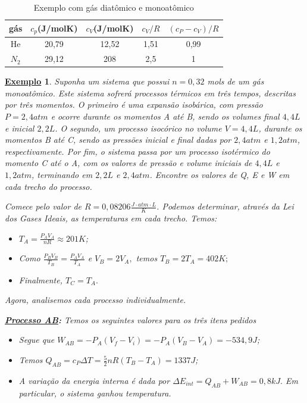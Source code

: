 \documentclass{article}
\newtheorem{example}{\underline{Exemplo}}
\begin{document}
\begin{center}
  \begin{table}[h!]
    \caption{Exemplo com gás diatômico e monoatômico}
    \centering
    \begin{tabular}{| c | c | c | c | c |}
      \hline
      gás & \(c_{p}\)(J/molK) & \(c_{V}\)(J/molK) & \(c_{V}/R\) & \((c_{P}-c_{V})/R\)\\
      \hline
      He & 20,79 & 12,52 & 1,51 & 0,99\\
      \(N_{2}\) & 29,12 & 208 & 2,5 & 1\\
      \hline
    \end{tabular}
  \end{table}
\end{center}
\begin{example}
  Suponha um sistema que possui \(n=0,32\) mols de um gás monoatômico. Este sistema sofrerá processos térmicos em três tempos,
  descritas por três momentos. O primeiro é uma expansão isobárica, com pressão \(P = 2,4atm\) e ocorre durante os momentos A até B, sendo os volumes final \(4,4L\) e inicial \(2,2L\). O segundo,
  um processo isocórico no volume \(V = 4,4L\), durante os momentos B até C, sendo as pressões inicial e final dadas por \(2,4atm\) e \(1,2atm\), respectivamente.
  Por fim, o sistema passa por um processo isotérmico do momento C até o A, com os valores de pressão e volume iniciais de \(4,4L\) e \(1,2atm\), terminando
  em \(2,2L\) e \(2,4atm\). Encontre os valores de Q, E e W em cada trecho do processo.

  Comece pelo valor de \(R = 0,08206 \frac{J \cdot atm \cdot L}{K}\). Podemos determinar, através da Lei dos Gases Ideais, 
  as temperaturas em cada trecho. Temos:
  \begin{itemize}
    \item[A)] \(T_{A} = \frac{P_{A}V_{A}}{nR}\approx 201K\);
    \item[B)] Como \(\frac{P_{B}V_{B}}{T_{B}} = \frac{P_{A}V_{A}}{T_{A}}\) e \(V_{B} = 2V_{A},\) temos \(T_{B} = 2T_{A} = 402K;\)
    \item[C)] Finalmente, \(T_{C} = T_{A}.\)
  \end{itemize}
  Agora, analisemos cada processo individualmente.

  \textbf{\underline{Processo AB}:} Temos os seguintes valores para os três itens pedidos
  \begin{itemize}
    \item[\(W_{AB}\):] Segue que \(W_{AB} = -P_{A}(V_{f}-V_{i}) = -P_{A}(V_{B}-V_{A}) = -534,9J\);
    \item[\(Q_{AB}\):] Temos \(Q_{AB} = c_{P}\Delta T = \frac{5}{2}nR(T_{B}-T_{A}) = 1337J\);
    \item[\(E_{AB}\):] A variação da energia interna é dada por \(\Delta E_{int} = Q_{AB} + W_{AB} = 0,8kJ.\) Em particular,
      o sistema ganhou temperatura.
  \end{itemize}


\end{example}
\end{document}
